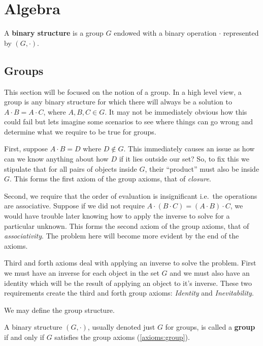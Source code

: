 \chapter{Algebra}


\begin{defn}
\label{defn:binary_structure}
  A \textbf{binary structure} is a group $G$ endowed with a binary operation $\cdot$ represented by $(G, \cdot)$.
\end{defn}


\section{Groups}

This section will be focused on the notion of a group.
In a high level view, a group is any binary structure for which there will always be a solution to $ A\cdot B = A\cdot C $, where $A,B,C \in G$.
It may not be immediately obvious how this could fail but lets imagine some scenarios to see where things can go wrong and determine what we require to be true for groups.

First, suppose $A\cdot B = D$ where $D \not\in G$. This immediately causes an issue as how can we know anything about how $D$ if it lies outside our set?
So, to fix this we stipulate that for all pairs of objects inside $G$, their ``product'' must also be inside $G$. 
This forms the first axiom of the group axioms, that of \emph{closure}.

Second, we require that the order of evaluation is insignificant i.e.\ the operations are associative.
Suppose if we did not require $A \cdot ( B \cdot C) = (A \cdot B) \cdot C$, we would have trouble later knowing how to apply the inverse to solve for a particular unknown.
This forms the second axiom of the group axioms, that of \emph{associativity}.
The problem here will become more evident by the end of the axioms.

Third and forth axioms deal with applying an inverse to solve the problem.
First we must have an inverse for each object in the set $G$ and we must also have an identity which will be the result of applying an object to it's inverse.
These two requirements create the third and forth group axioms: \emph{Identity} and \emph{Inevitability}.

We may define the group structure.
\begin{defn}
\label{defn:group}
  A binary structure $(G, \cdot)$, usually denoted just $G$ for groups, is called a \textbf{group} if and only if $G$ satisfies the group axioms (\ref{axioms:group}).
\end{defn}

